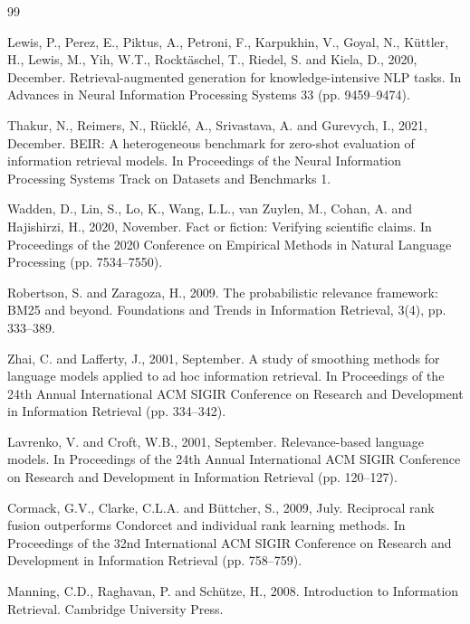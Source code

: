 \documentclass[conference]{IEEEtran}
\begin{document}
\begin{thebibliography}{99}
\footnotesize

Lewis, P., Perez, E., Piktus, A., Petroni, F., Karpukhin, V., Goyal, N., K\"uttler, H., Lewis, M., Yih, W.T.,
Rockt\"aschel, T., Riedel, S. and Kiela, D., 2020, December. Retrieval-augmented generation for knowledge-intensive NLP
tasks. In Advances in Neural Information Processing Systems 33 (pp. 9459--9474).

Thakur, N., Reimers, N., R\"uckl\'e, A., Srivastava, A. and Gurevych, I., 2021, December. BEIR: A heterogeneous benchmark
for zero-shot evaluation of information retrieval models. In Proceedings of the Neural Information Processing Systems
Track on Datasets and Benchmarks 1.

Wadden, D., Lin, S., Lo, K., Wang, L.L., van Zuylen, M., Cohan, A. and Hajishirzi, H., 2020, November. Fact or fiction:
Verifying scientific claims. In Proceedings of the 2020 Conference on Empirical Methods in Natural Language Processing
(pp. 7534--7550).

Robertson, S. and Zaragoza, H., 2009. The probabilistic relevance framework: BM25 and beyond. Foundations and Trends in
Information Retrieval, 3(4), pp. 333--389.

Zhai, C. and Lafferty, J., 2001, September. A study of smoothing methods for language models applied to ad hoc information
retrieval. In Proceedings of the 24th Annual International ACM SIGIR Conference on Research and Development in
Information Retrieval (pp. 334--342).

Lavrenko, V. and Croft, W.B., 2001, September. Relevance-based language models. In Proceedings of the 24th Annual
International ACM SIGIR Conference on Research and Development in Information Retrieval (pp. 120--127).

Cormack, G.V., Clarke, C.L.A. and B\"uttcher, S., 2009, July. Reciprocal rank fusion outperforms Condorcet and individual
rank learning methods. In Proceedings of the 32nd International ACM SIGIR Conference on Research and Development in
Information Retrieval (pp. 758--759).

Manning, C.D., Raghavan, P. and Sch\"utze, H., 2008. Introduction to Information Retrieval. Cambridge University Press.


\end{thebibliography}
\end{document}
